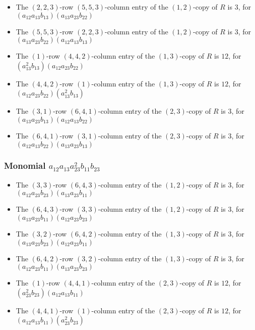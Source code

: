\documentclass{article}
\begin{document}
\begin{itemize}
\item The $(2, 2, 3)$-row $(5, 5, 3)$-column entry of the $ \left(1, 2\right) $-copy of $R$ is $ 3 $, for $( a_{12} a_{13} b_{13} )( a_{13} a_{23} b_{22} )$ 
\item The $(5, 5, 3)$-row $(2, 2, 3)$-column entry of the $ \left(1, 2\right) $-copy of $R$ is $ 3 $, for $( a_{13} a_{23} b_{22} )( a_{12} a_{13} b_{13} )$ 
\item The $(1)$-row $(4, 4, 2)$-column entry of the $ \left(1, 3\right) $-copy of $R$ is $ 12 $, for $( a_{13}^{2} b_{13} )( a_{12} a_{23} b_{22} )$ 
\item The $(4, 4, 2)$-row $(1)$-column entry of the $ \left(1, 3\right) $-copy of $R$ is $ 12 $, for $( a_{12} a_{23} b_{22} )( a_{13}^{2} b_{13} )$ 
\item The $(3, 1)$-row $(6, 4, 1)$-column entry of the $ \left(2, 3\right) $-copy of $R$ is $ 3 $, for $( a_{13} a_{23} b_{13} )( a_{12} a_{13} b_{22} )$ 
\item The $(6, 4, 1)$-row $(3, 1)$-column entry of the $ \left(2, 3\right) $-copy of $R$ is $ 3 $, for $( a_{12} a_{13} b_{22} )( a_{13} a_{23} b_{13} )$ 
\end{itemize}
\subsubsection{Monomial $ a_{12} a_{13} a_{23}^{2} b_{11} b_{23} $}

\begin{itemize}
\item The $(3, 3)$-row $(6, 4, 3)$-column entry of the $ \left(1, 2\right) $-copy of $R$ is $ 3 $, for $( a_{12} a_{23} b_{23} )( a_{13} a_{23} b_{11} )$ 
\item The $(6, 4, 3)$-row $(3, 3)$-column entry of the $ \left(1, 2\right) $-copy of $R$ is $ 3 $, for $( a_{13} a_{23} b_{11} )( a_{12} a_{23} b_{23} )$ 
\item The $(3, 2)$-row $(6, 4, 2)$-column entry of the $ \left(1, 3\right) $-copy of $R$ is $ 3 $, for $( a_{13} a_{23} b_{23} )( a_{12} a_{23} b_{11} )$ 
\item The $(6, 4, 2)$-row $(3, 2)$-column entry of the $ \left(1, 3\right) $-copy of $R$ is $ 3 $, for $( a_{12} a_{23} b_{11} )( a_{13} a_{23} b_{23} )$ 
\item The $(1)$-row $(4, 4, 1)$-column entry of the $ \left(2, 3\right) $-copy of $R$ is $ 12 $, for $( a_{23}^{2} b_{23} )( a_{12} a_{13} b_{11} )$ 
\item The $(4, 4, 1)$-row $(1)$-column entry of the $ \left(2, 3\right) $-copy of $R$ is $ 12 $, for $( a_{12} a_{13} b_{11} )( a_{23}^{2} b_{23} )$ 
\end{itemize}
\end{document}
